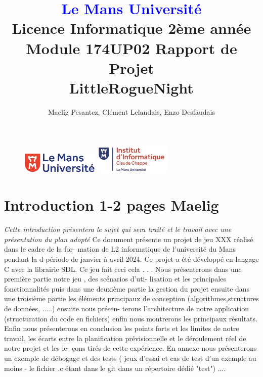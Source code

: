 \documentclass[10pt]{article}
\begin{document}
\begin{figure}
\includegraphics[width=3.7cm]{logolemansU.png}
\hspace{160pt}
\includegraphics[width=3.7cm]{logo_IC2.png}
\end{figure}

\title{\textbf{\textcolor{blue}{Le Mans Université}}\\Licence Informatique 2ème année\\Module 174UP02 Rapport de Projet\\\textbf{LittleRogueNight}}
\author{Maelig Pesantez, Clément Lelandais, Enzo Desfaudais}
\maketitle

\newpage
\tableofcontents

\newpage

\section{Introduction 1-2 pages Maelig}
\textit{Cette introduction présentera le sujet qui sera traité et le travail avec une
présentation du plan adopté}
Ce document présente un projet de jeu XXX réalisé dans le cadre de la for-
mation de L2 informatique de l’université du Mans pendant la d-période de
janvier à avril 2024. Ce projet a été développé en langage C avec la librairie
SDL. Ce jeu fait ceci cela . . .
Nous présenterons dans une première partie notre jeu , des scénarios d’uti-
lisation et les principales fonctionnalités puis dans une deuxième partie la
gestion du projet ensuite dans une troisième partie les éléments principaux
de conception (algorithmes,structures de données, .....) ensuite nous présen-
terons l’architecture de notre application (structuration du code en fichiers)
enfin nous montrerons les principaux résultats. Enfin nous présenterons en
conclusion les points forts et les limites de notre travail, les écarts entre la
planification prévisionnelle et le déroulement réel de notre projet et les le-
çons tirés de cette expérience. En annexe nous présenterons un exemple de
débogage et des tests ( jeux d’essai et cas de test d’un exemple au moins -
le fichier .c étant dans le git dans un répertoire dédié "test") ....
\end{document}
